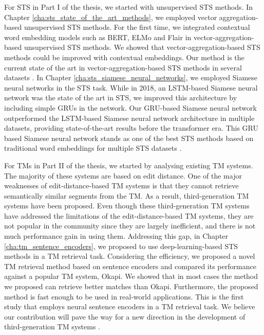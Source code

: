 For STS in Part I of the thesis, we started with unsupervised STS methods. In Chapter \ref{cha:sts_state_of_the_art_methods}, we employed vector aggregation-based unsupervised STS methods. For the first time, we integrated contextual word embedding models such as BERT, ELMo and Flair in vector-aggregation-based unsupervised STS methods. We showed that vector-aggregation-based STS methods could be improved with contextual embeddings. Our method is the current state of the art in vector-aggregation-based STS methods in several datasets \autocite{ranasinghe-etal-2019-enhancing}. In Chapter \ref{cha:sts_siamese_neural_networks}, we employed Siamese neural networks in the STS task. While in 2018, an LSTM-based Siamese neural network was the state of the art in STS, we improved this architecture by including simple GRUs in the network. Our GRU-based Siamese neural network outperformed the LSTM-based Siamese neural network architecture in multiple datasets, providing state-of-the-art results before the transformer era. This GRU based Siamese neural network stands as one of the best STS methods based on traditional word embeddings for multiple STS datasets \autocite{ranasinghe-etal-2019-semantic}.

For TMs in Part II of the thesis, we started by analysing existing TM systems. The majority of these systems are based on edit distance. One of the major weaknesses of edit-distance-based TM systems is that they cannot retrieve semantically similar segments from the TM. As a result, third-generation TM systems have been proposed. Even though these third-generation TM systems have addressed the limitations of the edit-distance-based TM systems, they are not popular in the community since they are largely inefficient, and there is not much performance gain in using them. Addressing this gap, in Chapter \ref{cha:tm_sentence_encoders}, we proposed to use deep-learning-based STS methods in a TM retrieval task. Considering the efficiency, we proposed a novel TM retrieval method based on sentence encoders and compared its performance against a popular TM system, Okapi. We showed that in most cases the method we proposed can retrieve better matches than Okapi. Furthermore, the proposed method is fast enough to be used in real-world applications. This is the first study that employs neural sentence encoders in a TM retrieval task. We believe our contribution will pave the way for a new direction in the development of third-generation TM systems \autocite{ranasinghe-etal-2020-intelligent, ranasinghe:2021}.

